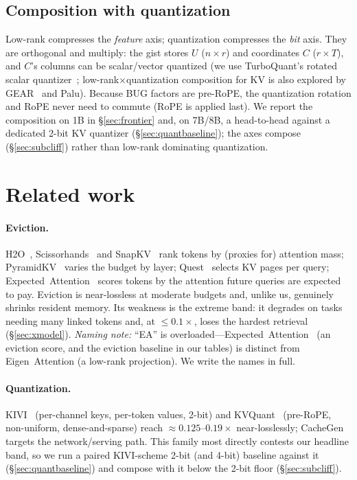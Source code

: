 \documentclass[11pt]{article}
\begin{document}
\subsection{Composition with quantization}
\label{sec:quant}
Low-rank compresses the \emph{feature} axis; quantization compresses the
\emph{bit} axis. They are orthogonal and multiply: the gist stores $U$
($n\times r$) and coordinates $C$ ($r \times T$), and $C$'s columns can be
scalar/vector quantized (we use TurboQuant's rotated scalar
quantizer~\citep{zandieh2025turboquant}; low-rank$\times$quantization composition
for KV is also explored by GEAR~\citep{kang2024gear} and Palu). Because BUG
factors are pre-RoPE, the quantization rotation and RoPE never need to commute
(RoPE is applied last). We report the composition on 1B in \S\ref{sec:frontier}
and, on 7B/8B, a head-to-head against a dedicated 2-bit KV quantizer
(\S\ref{sec:quantbaseline}); the axes compose (\S\ref{sec:subcliff}) rather than
low-rank dominating quantization.

\section{Related work}
\label{sec:related}

\paragraph{Eviction.} H2O~\citep{zhang2023h2o},
Scissorhands~\citep{liu2023scissorhands} and SnapKV~\citep{li2024snapkv} rank
tokens by (proxies for) attention mass; PyramidKV~\citep{cai2024pyramidkv} varies
the budget by layer; Quest~\citep{tang2024quest} selects KV pages per query;
Expected~Attention~\citep{devoto2025expected} scores tokens by the attention
future queries are expected to pay. Eviction is near-lossless at moderate budgets
and, unlike us, genuinely shrinks resident memory. Its weakness is the extreme
band: it degrades on tasks needing many linked tokens and, at $\le0.1\times$,
loses the hardest retrieval (\S\ref{sec:xmodel}). \emph{Naming note:} ``EA''
is overloaded---Expected~Attention~\citep{devoto2025expected} (an eviction score,
and the eviction baseline in our tables) is distinct from Eigen~Attention
\citep{saxena2024eigen} (a low-rank projection). We write the names in full.

\paragraph{Quantization.} KIVI~\citep{liu2024kivi} (per-channel keys, per-token
values, 2-bit) and KVQuant~\citep{hooper2024kvquant} (pre-RoPE, non-uniform,
dense-and-sparse) reach $\approx0.125$--$0.19\times$ near-losslessly;
CacheGen~\citep{liu2024cachegen} targets the network/serving path. This family
most directly contests our headline band, so we run a paired KIVI-scheme 2-bit
(and 4-bit) baseline against it (\S\ref{sec:quantbaseline}) and compose with it
below the 2-bit floor (\S\ref{sec:subcliff}).
\end{document}

